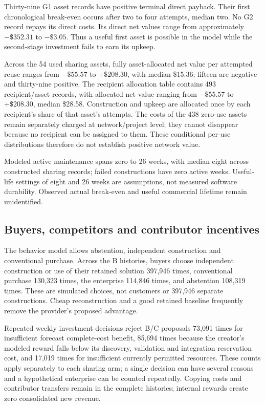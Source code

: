 Thirty-nine G1 asset records have positive terminal direct payback. Their first chronological break-even occurs after two to four attempts, median two. No G2 record repays its direct costs. Its direct net values range from approximately $-\$352.31$ to $-\$3.05$. Thus a useful first asset is possible in the model while the second-stage investment fails to earn its upkeep.

Across the 54 used sharing assets, fully asset-allocated net value per attempted reuse ranges from $-\$55.57$ to $+\$208.30$, with median \$15.36; fifteen are negative and thirty-nine positive. The recipient allocation table contains 493 recipient/asset records, with allocated net value ranging from $-\$55.57$ to $+\$208.30$, median \$28.58. Construction and upkeep are allocated once by each recipient's share of that asset's attempts. The costs of the 438 zero-use assets remain separately charged at network/project level; they cannot disappear because no recipient can be assigned to them. These conditional per-use distributions therefore do not establish positive network value.

Modeled active maintenance spans zero to 26 weeks, with median eight across constructed sharing records; failed constructions have zero active weeks. Useful-life settings of eight and 26 weeks are assumptions, not measured software durability. Observed actual break-even and useful commercial lifetime remain unidentified.

\subsection{Buyers, competitors and contributor incentives}

The behavior model allows abstention, independent construction and conventional purchase. Across the B histories, buyers choose independent construction or use of their retained solution 397,946 times, conventional purchase 130,323 times, the enterprise 114,846 times, and abstention 108,319 times. These are simulated choices, not customers or 397,946 separate constructions. Cheap reconstruction and a good retained baseline frequently remove the provider's proposed advantage.

Repeated weekly investment decisions reject B/C proposals 73,091 times for insufficient forecast complete-cost benefit, 85,694 times because the creator's modeled reward falls below its discovery, validation and integration reservation cost, and 17,019 times for insufficient currently permitted resources. These counts apply separately to each sharing arm; a single decision can have several reasons and a hypothetical enterprise can be counted repeatedly. Copying costs and contributor transfers remain in the complete histories; internal rewards create zero consolidated new revenue.

